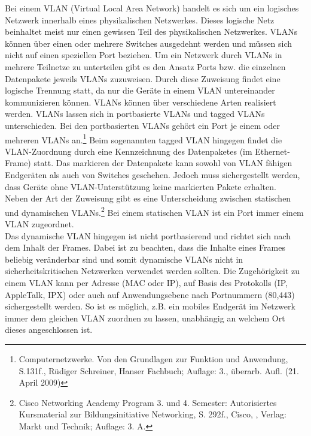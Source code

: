 Bei einem VLAN (Virtual Local Area Network) handelt es sich um ein logisches Netzwerk innerhalb eines physikalischen Netzwerkes.
Dieses logische Netz beinhaltet meist nur einen gewissen Teil des physikalischen Netzwerkes.
VLANs können über einen oder mehrere Switches ausgedehnt werden und müssen sich nicht auf einen speziellen Port beziehen.
Um ein Netzwerk durch VLANs in mehrere Teilnetze zu unterteilen gibt es den Ansatz Ports bzw. die einzelnen Datenpakete jeweils VLANs zuzuweisen.
Durch diese Zuweisung findet eine logische Trennung statt, da nur die Geräte in einem VLAN untereinander kommunizieren können.
VLANs können über verschiedene Arten realisiert werden.
VLANs lassen sich in portbasierte VLANs und tagged VLANs unterschieden.
Bei den portbasierten VLANs gehört ein Port je einem oder mehreren VLANs an.\footnote{Computernetzwerke. Von den Grundlagen zur Funktion und Anwendung, S.131f., Rüdiger Schreiner, Hanser Fachbuch; Auflage: 3., überarb. Aufl. (21. April 2009)}
Beim sogenannten tagged VLAN hingegen findet die VLAN-Zuordnung durch eine Kennzeichnung des Datenpaketes (im Ethernet-Frame) statt.
Das markieren der Datenpakete kann sowohl von VLAN fähigen Endgeräten als auch von Switches geschehen.
Jedoch muss sichergestellt werden, dass Geräte ohne VLAN-Unterstützung keine markierten Pakete erhalten.\\
Neben der Art der Zuweisung gibt es eine Unterscheidung zwischen statischen und dynamischen VLANs.\footnote{Cisco Networking Academy Program 3. und 4. Semester: Autorisiertes Kursmaterial zur Bildungsinitiative Networking, S. 292f., Cisco, , Verlag: Markt und Technik; Auflage: 3. A. }
Bei einem statischen VLAN ist ein Port immer einem VLAN zugeordnet.
\\
Das dynamische VLAN hingegen ist nicht portbasierend und richtet sich nach dem Inhalt der Frames.
Dabei ist zu beachten, dass die Inhalte eines Frames beliebig veränderbar sind und somit dynamische VLANs nicht in sicherheitskritischen Netzwerken verwendet werden sollten.
Die Zugehörigkeit zu einem VLAN kann per Adresse (MAC oder IP), auf Basis des Protokolls (IP, AppleTalk, IPX) oder auch auf Anwendungsebene nach Portnummern (80,443) sichergestellt werden.
So ist es möglich, z.B. ein mobiles Endgerät im Netzwerk immer dem gleichen VLAN zuordnen zu lassen, unabhängig an welchem Ort dieses angeschlossen ist.\\

